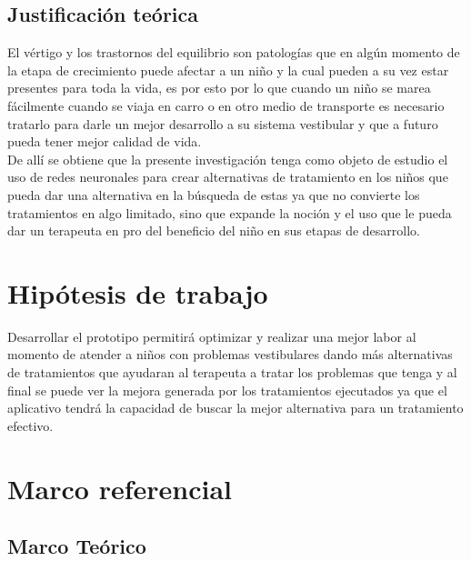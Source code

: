 	\subsection{Justificación teórica}
		El vértigo y los trastornos del equilibrio son patologías que en algún momento de la etapa de crecimiento puede afectar a un niño y la cual pueden a su vez estar presentes para toda la vida, es por esto por lo que cuando un niño se marea fácilmente cuando se viaja en carro o en otro medio de transporte es necesario tratarlo para darle un mejor desarrollo a su sistema vestibular y que a futuro pueda tener mejor calidad de vida.\\
		De allí se obtiene que la presente investigación tenga como objeto de estudio el uso de redes neuronales para crear alternativas de tratamiento en los niños que pueda dar una alternativa en la búsqueda de estas ya que no convierte los tratamientos en algo limitado, sino que expande la noción y el uso que le pueda dar un terapeuta en pro del beneficio del niño en sus etapas de desarrollo.\\
\section{Hipótesis de trabajo}
	Desarrollar el prototipo permitirá optimizar y realizar una mejor labor al momento de atender a niños con problemas vestibulares dando más alternativas de tratamientos que ayudaran al terapeuta a tratar los problemas que tenga y al final se puede ver la mejora generada por los tratamientos ejecutados ya que el aplicativo tendrá la capacidad de buscar la mejor alternativa para un tratamiento efectivo.\\
\section{Marco referencial}
	\subsection{Marco Teórico}
